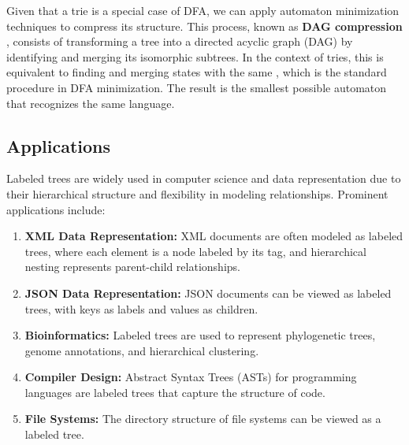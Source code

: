 

Given that a trie is a special case of DFA, we can apply automaton minimization techniques to compress its structure. 
This process, known as \textbf{DAG compression} , consists of transforming a tree into a directed acyclic graph (DAG) by identifying and merging its isomorphic subtrees.
In the context of tries, this is equivalent to finding and merging states with the same , which is the standard procedure in DFA minimization. 
The result is the smallest possible automaton that recognizes the same language.


\subsection{Applications}
Labeled trees are widely used in computer science and data representation due to their hierarchical structure and flexibility in modeling relationships. Prominent applications include:
\begin{enumerate}
    \item \textbf{XML Data Representation:} XML documents are often modeled as labeled trees, where each element is a node labeled by its tag, and hierarchical nesting represents parent-child relationships.
    \item \textbf{JSON Data Representation:} JSON documents can be viewed as labeled trees, with keys as labels and values as children.
    \item \textbf{Bioinformatics:} Labeled trees are used to represent phylogenetic trees, genome annotations, and hierarchical clustering.
    \item \textbf{Compiler Design:} Abstract Syntax Trees (ASTs) for programming languages are labeled trees that capture the structure of code.
    \item \textbf{File Systems:} The directory structure of file systems can be viewed as a labeled tree.
\end{enumerate}

